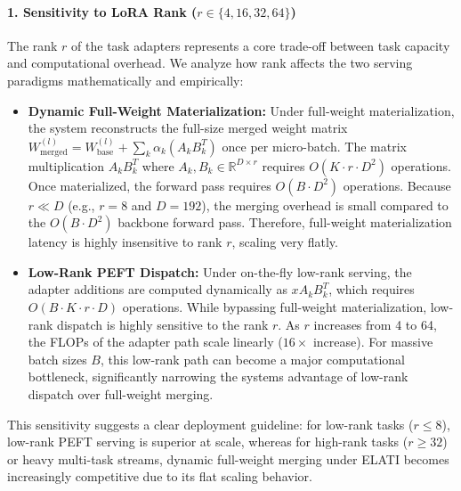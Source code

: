 \paragraph{1. Sensitivity to LoRA Rank ($r \in \{4, 16, 32, 64\}$)}
The rank $r$ of the task adapters represents a core trade-off between task capacity and computational overhead. We analyze how rank affects the two serving paradigms mathematically and empirically:
\begin{itemize}
    \item \textbf{Dynamic Full-Weight Materialization:} Under full-weight materialization, the system reconstructs the full-size merged weight matrix $W_{\text{merged}}^{(l)} = W_{\text{base}}^{(l)} + \sum_k \alpha_k (A_k B_k^T)$ once per micro-batch. The matrix multiplication $A_k B_k^T$ where $A_k, B_k \in \mathbb{R}^{D \times r}$ requires $O(K \cdot r \cdot D^2)$ operations. Once materialized, the forward pass requires $O(B \cdot D^2)$ operations. Because $r \ll D$ (e.g., $r = 8$ and $D = 192$), the merging overhead is small compared to the $O(B \cdot D^2)$ backbone forward pass. Therefore, full-weight materialization latency is highly insensitive to rank $r$, scaling very flatly.
    \item \textbf{Low-Rank PEFT Dispatch:} Under on-the-fly low-rank serving, the adapter additions are computed dynamically as $x A_k B_k^T$, which requires $O(B \cdot K \cdot r \cdot D)$ operations. While bypassing full-weight materialization, low-rank dispatch is highly sensitive to the rank $r$. As $r$ increases from 4 to 64, the FLOPs of the adapter path scale linearly ($16\times$ increase). For massive batch sizes $B$, this low-rank path can become a major computational bottleneck, significantly narrowing the systems advantage of low-rank dispatch over full-weight merging.
\end{itemize}
This sensitivity suggests a clear deployment guideline: for low-rank tasks ($r \le 8$), low-rank PEFT serving is superior at scale, whereas for high-rank tasks ($r \ge 32$) or heavy multi-task streams, dynamic full-weight merging under ELATI becomes increasingly competitive due to its flat scaling behavior.

